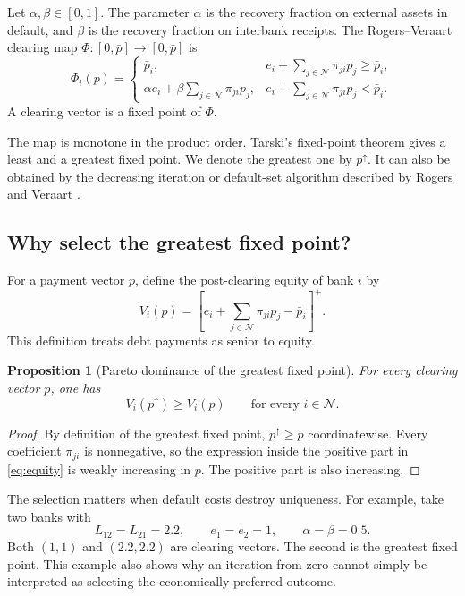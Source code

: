 \documentclass[11pt]{article}
\newtheorem{proposition}[theorem]{Proposition}
\theoremstyle{definition}
\theoremstyle{remark}
\newcommand{\N}{\mathcal{N}}
\newcommand{\pbar}{\bar p}
\newcommand{\pos}[1]{\left[#1\right]^+}
\begin{document}
Let $\alpha,\beta\in[0,1]$.  The parameter $\alpha$ is the recovery fraction
on external assets in default, and $\beta$ is the recovery fraction on
interbank receipts.  The Rogers--Veraart clearing map
$\Phi:[0,\pbar]\to[0,\pbar]$ is
\begin{equation}\label{eq:clearing-map}
  \Phi_i(p)=
  \begin{cases}
    \pbar_i,
      & e_i+\displaystyle\sum_{j\in\N}\pi_{ji}p_j\geq\pbar_i,\\[2mm]
    \alpha e_i+\beta\displaystyle\sum_{j\in\N}\pi_{ji}p_j,
      & e_i+\displaystyle\sum_{j\in\N}\pi_{ji}p_j<\pbar_i.
  \end{cases}
\end{equation}
A clearing vector is a fixed point of $\Phi$.

The map is monotone in the product order.  Tarski's fixed-point theorem gives
a least and a greatest fixed point.  We denote the greatest one by $p^\uparrow$.
It can also be obtained by the decreasing iteration or default-set algorithm
described by Rogers and Veraart \cite{RogersVeraart2013}.

\subsection{Why select the greatest fixed point?}

For a payment vector $p$, define the post-clearing equity of bank $i$ by
\begin{equation}\label{eq:equity}
  V_i(p)=
  \pos{e_i+\sum_{j\in\N}\pi_{ji}p_j-\pbar_i}.
\end{equation}
This definition treats debt payments as senior to equity.

\begin{proposition}[Pareto dominance of the greatest fixed point]
For every clearing vector $p$, one has
\begin{equation}
  V_i(p^\uparrow)\geq V_i(p)
  \qquad\text{for every }i\in\N.
\end{equation}
\end{proposition}

\begin{proof}
By definition of the greatest fixed point, $p^\uparrow\geq p$ coordinatewise.
Every coefficient $\pi_{ji}$ is nonnegative, so the expression inside the
positive part in \eqref{eq:equity} is weakly increasing in $p$.  The positive
part is also increasing.
\end{proof}

The selection matters when default costs destroy uniqueness.  For example,
take two banks with
\begin{equation}
  L_{12}=L_{21}=2.2,
  \qquad e_1=e_2=1,
  \qquad \alpha=\beta=0.5.
\end{equation}
Both $(1,1)$ and $(2.2,2.2)$ are clearing vectors.  The second is the greatest
fixed point.  This example also shows why an iteration from zero cannot simply
be interpreted as selecting the economically preferred outcome.
\end{document}
